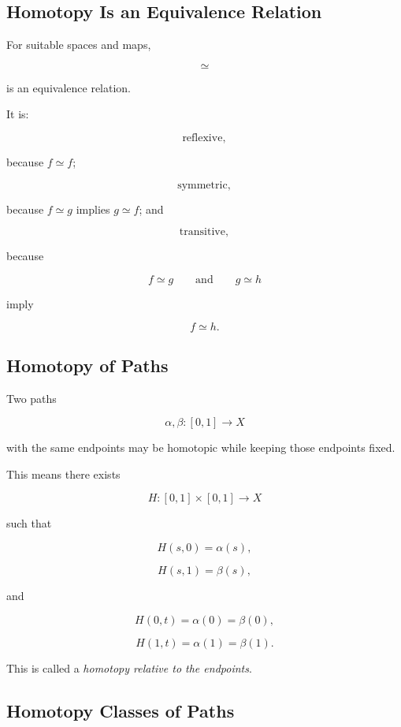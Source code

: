 \subsection{Homotopy Is an Equivalence Relation}
\label{subsec:homotopy-equivalence-relation}

For suitable spaces and maps,

\[
\simeq
\]

is an equivalence relation.

It is:

\[
\boxed{\text{reflexive}},
\]

because \(f\simeq f\);

\[
\boxed{\text{symmetric}},
\]

because \(f\simeq g\) implies \(g\simeq f\); and

\[
\boxed{\text{transitive}},
\]

because

\[
f\simeq g
\qquad\text{and}\qquad
g\simeq h
\]

imply

\[
f\simeq h.
\]

\subsection{Homotopy of Paths}
\label{subsec:homotopy-of-paths}

Two paths

\[
\alpha,\beta:[0,1]\to X
\]

with the same endpoints may be homotopic while keeping those endpoints fixed.

This means there exists

\[
H:[0,1]\times[0,1]\to X
\]

such that

\[
H(s,0)=\alpha(s),
\]

\[
H(s,1)=\beta(s),
\]

and

\[
\boxed{
H(0,t)=\alpha(0)=\beta(0),
}
\]

\[
\boxed{
H(1,t)=\alpha(1)=\beta(1).
}
\]

This is called a \emph{homotopy relative to the endpoints}.

\subsection{Homotopy Classes of Paths}
\label{subsec:homotopy-classes-paths}

